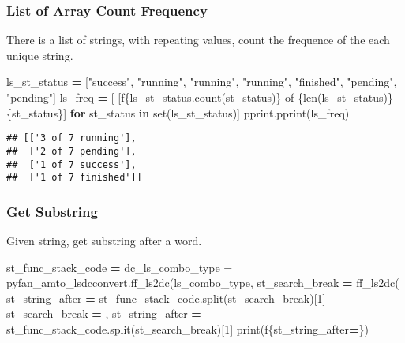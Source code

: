 \documentclass[
]{book}
\newenvironment{Shaded}{\begin{snugshade}}{\end{snugshade}}
\newcommand{\BuiltInTok}[1]{#1}
\newcommand{\ControlFlowTok}[1]{\textcolor[rgb]{0.13,0.29,0.53}{\textbf{#1}}}
\newcommand{\DecValTok}[1]{\textcolor[rgb]{0.00,0.00,0.81}{#1}}
\newcommand{\KeywordTok}[1]{\textcolor[rgb]{0.13,0.29,0.53}{\textbf{#1}}}
\newcommand{\NormalTok}[1]{#1}
\newcommand{\OperatorTok}[1]{\textcolor[rgb]{0.81,0.36,0.00}{\textbf{#1}}}
\newcommand{\SpecialCharTok}[1]{\textcolor[rgb]{0.00,0.00,0.00}{#1}}
\newcommand{\SpecialStringTok}[1]{\textcolor[rgb]{0.31,0.60,0.02}{#1}}
\newcommand{\StringTok}[1]{\textcolor[rgb]{0.31,0.60,0.02}{#1}}
\begin{document}
\hypertarget{list-of-array-count-frequency}{%
\subsubsection{List of Array Count Frequency}\label{list-of-array-count-frequency}}

There is a list of strings, with repeating values, count the frequence of the each unique string.

\begin{Shaded}
\begin{Highlighting}[]
\NormalTok{ls\_st\_status }\OperatorTok{=}\NormalTok{ [}\StringTok{"success"}\NormalTok{, }\StringTok{"running"}\NormalTok{, }\StringTok{"running"}\NormalTok{, }\StringTok{"running"}\NormalTok{, }\StringTok{"finished"}\NormalTok{, }\StringTok{"pending"}\NormalTok{, }\StringTok{"pending"}\NormalTok{]}
\NormalTok{ls\_freq }\OperatorTok{=}\NormalTok{ [ [}\SpecialStringTok{f\textquotesingle{}}\SpecialCharTok{\{}\NormalTok{ls\_st\_status}\SpecialCharTok{.}\NormalTok{count(st\_status)}\SpecialCharTok{\}}\SpecialStringTok{ of }\SpecialCharTok{\{}\BuiltInTok{len}\NormalTok{(ls\_st\_status)}\SpecialCharTok{\}}\SpecialStringTok{ }\SpecialCharTok{\{}\NormalTok{st\_status}\SpecialCharTok{\}}\SpecialStringTok{\textquotesingle{}}\NormalTok{]  }\ControlFlowTok{for}\NormalTok{ st\_status }\KeywordTok{in} \BuiltInTok{set}\NormalTok{(ls\_st\_status)]}
\NormalTok{pprint.pprint(ls\_freq)}
\end{Highlighting}
\end{Shaded}

\begin{verbatim}
## [['3 of 7 running'],
##  ['2 of 7 pending'],
##  ['1 of 7 success'],
##  ['1 of 7 finished']]
\end{verbatim}

\hypertarget{get-substring}{%
\subsubsection{Get Substring}\label{get-substring}}

Given string, get substring after a word.

\begin{Shaded}
\begin{Highlighting}[]
\NormalTok{st\_func\_stack\_code }\OperatorTok{=} \StringTok{\textquotesingle{}dc\_ls\_combo\_type = pyfan\_amto\_lsdcconvert.ff\_ls2dc(ls\_combo\_type,\textquotesingle{}}
\NormalTok{st\_search\_break }\OperatorTok{=} \StringTok{\textquotesingle{}ff\_ls2dc(\textquotesingle{}}
\NormalTok{st\_string\_after }\OperatorTok{=}\NormalTok{ st\_func\_stack\_code.split(st\_search\_break)[}\DecValTok{1}\NormalTok{]}
\NormalTok{st\_search\_break }\OperatorTok{=} \StringTok{\textquotesingle{},\textquotesingle{}}
\NormalTok{st\_string\_after }\OperatorTok{=}\NormalTok{ st\_func\_stack\_code.split(st\_search\_break)[}\DecValTok{1}\NormalTok{]}
\BuiltInTok{print}\NormalTok{(}\SpecialStringTok{f\textquotesingle{}}\SpecialCharTok{\{}\NormalTok{st\_string\_after}\OperatorTok{=}\SpecialCharTok{\}}\SpecialStringTok{\textquotesingle{}}\NormalTok{)}
\end{Highlighting}
\end{Shaded}
\end{document}
